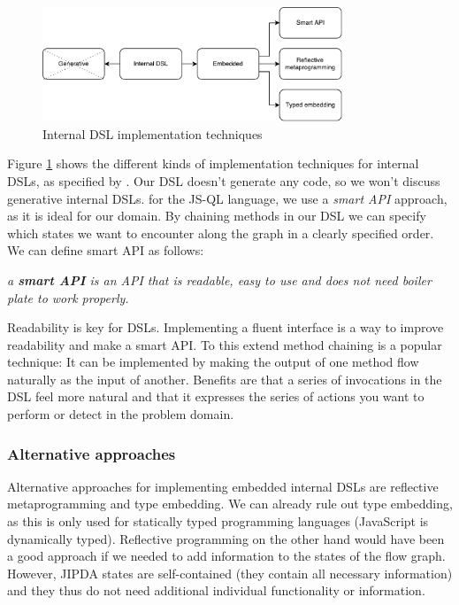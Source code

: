 \begin{figure}[!h]
    \centering
      \includegraphics[width=0.8\textwidth]{images/DSLTechniques} 
      \caption{Internal DSL implementation techniques}
    \label{fig:DSLTechniques}
\end{figure}

Figure \ref{fig:DSLTechniques} shows the different kinds of implementation techniques for internal DSLs, as specified by \cite{Ghosh:2010}. Our DSL doesn't generate any code, so we won't discuss generative internal DSLs. for the JS-QL language, we use a \textit{smart API} approach, as it is ideal for our domain. By chaining methods in our DSL we can specify which states we want to encounter along the graph in a clearly specified order. We can define smart API as follows:

\begin{definition}
    \textit{a \textbf{smart API} is an API that is readable, easy to use and does not need boiler plate to work properly.}
\end{definition}

Readability is key for DSLs. Implementing a fluent interface is a way to improve readability and make a smart API. To this extend method chaining is a popular technique: It can be implemented by making the output of one method flow naturally as the input of another. Benefits are that a series of invocations in the DSL feel more natural and that it expresses the series of actions you want to perform or detect in the problem domain. 

\subsubsection*{Alternative approaches}

Alternative approaches for implementing embedded internal DSLs are reflective metaprogramming and type embedding.
We can already rule out type embedding, as this is only used for statically typed programming languages (JavaScript is dynamically typed). Reflective programming on the other hand would have been a good approach if we needed to add information to the states of the flow graph. However, JIPDA states are self-contained (they contain all necessary information) and they thus do not need additional individual functionality or information.

